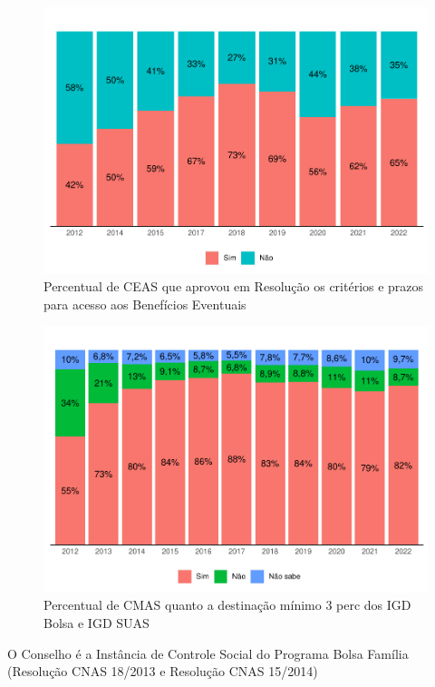 \documentclass[
  brazilian]{report}
\begin{document}
\begin{figure}
\includegraphics{Censo-SUAS-2022_files/figure-latex/ceas-be-1} \caption[Percentual de CEAS que aprovou em Resolução os critérios e prazos para acesso aos Benefícios Eventuais]{Percentual de CEAS que aprovou em Resolução os critérios e prazos para acesso aos Benefícios Eventuais}\label{fig:ceas-be}
\end{figure}

\begin{figure}
\includegraphics{Censo-SUAS-2022_files/figure-latex/cmas_igd-1} \caption[Percentual de CMAS quanto a destinação mínimo 3 perc dos IGD Bolsa e IGD SUAS]{Percentual de CMAS quanto a destinação mínimo 3 perc dos IGD Bolsa e IGD SUAS}\label{fig:cmas_igd}
\end{figure}

O Conselho é a Instância de Controle Social do Programa Bolsa Família
(Resolução CNAS 18/2013 e Resolução CNAS 15/2014)
\end{document}
